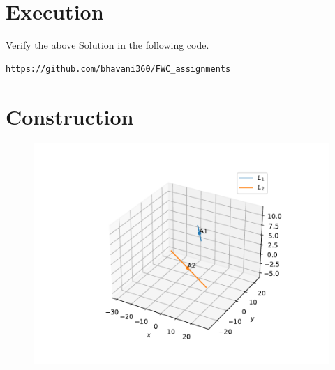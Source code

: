 \documentclass[journal,10pt,twocolumn]{article}
\begin{document}
\section*{Execution}
Verify the above Solution in the following code.\\
\begin{lstlisting}
https://github.com/bhavani360/FWC_assignments
\end{lstlisting}

 

\section*{Construction}

\begin{figure}[h]
\includegraphics[scale=0.5]{opt_2.pdf} 
\end{figure}
\end{document}
